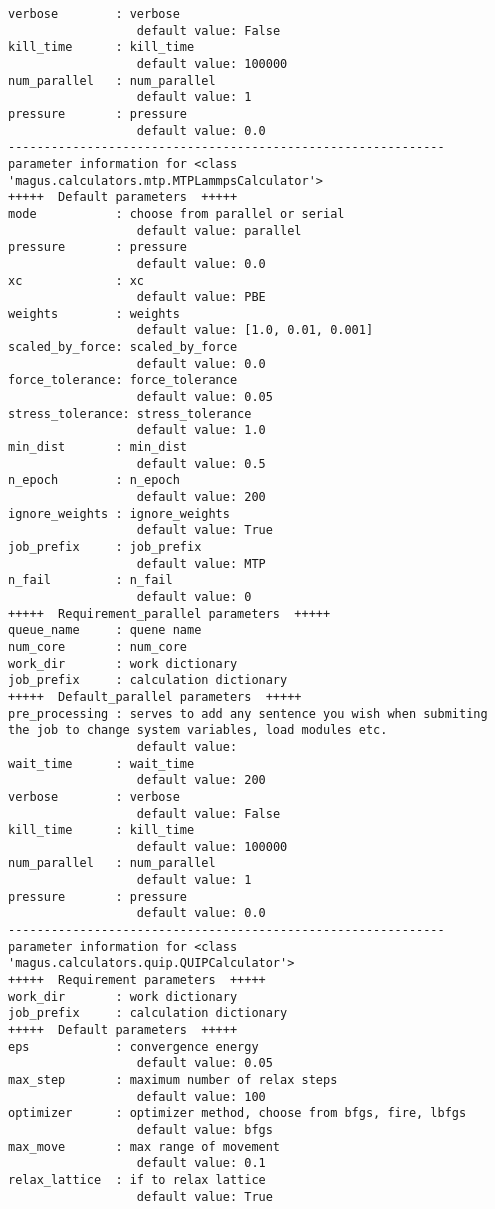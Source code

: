 \documentclass[12pt,oneside]{book}
\begin{document}
\begin{tcolorbox}
\begin{verbatim}
verbose        : verbose
                  default value: False
kill_time      : kill_time
                  default value: 100000
num_parallel   : num_parallel
                  default value: 1
pressure       : pressure
                  default value: 0.0
-------------------------------------------------------------
parameter information for <class 'magus.calculators.mtp.MTPLammpsCalculator'>
+++++  Default parameters  +++++
mode           : choose from parallel or serial
                  default value: parallel
pressure       : pressure
                  default value: 0.0
xc             : xc
                  default value: PBE
weights        : weights
                  default value: [1.0, 0.01, 0.001]
scaled_by_force: scaled_by_force
                  default value: 0.0
force_tolerance: force_tolerance
                  default value: 0.05
stress_tolerance: stress_tolerance
                  default value: 1.0
min_dist       : min_dist
                  default value: 0.5
n_epoch        : n_epoch
                  default value: 200
ignore_weights : ignore_weights
                  default value: True
job_prefix     : job_prefix
                  default value: MTP
n_fail         : n_fail
                  default value: 0
+++++  Requirement_parallel parameters  +++++
queue_name     : quene name
num_core       : num_core
work_dir       : work dictionary
job_prefix     : calculation dictionary
+++++  Default_parallel parameters  +++++
pre_processing : serves to add any sentence you wish when submiting the job to change system variables, load modules etc.
                  default value: 
wait_time      : wait_time
                  default value: 200
verbose        : verbose
                  default value: False
kill_time      : kill_time
                  default value: 100000
num_parallel   : num_parallel
                  default value: 1
pressure       : pressure
                  default value: 0.0
-------------------------------------------------------------
parameter information for <class 'magus.calculators.quip.QUIPCalculator'>
+++++  Requirement parameters  +++++
work_dir       : work dictionary
job_prefix     : calculation dictionary
+++++  Default parameters  +++++
eps            : convergence energy
                  default value: 0.05
max_step       : maximum number of relax steps
                  default value: 100
optimizer      : optimizer method, choose from bfgs, fire, lbfgs
                  default value: bfgs
max_move       : max range of movement
                  default value: 0.1
relax_lattice  : if to relax lattice
                  default value: True

\end{verbatim}
\end{tcolorbox}
\end{document}
